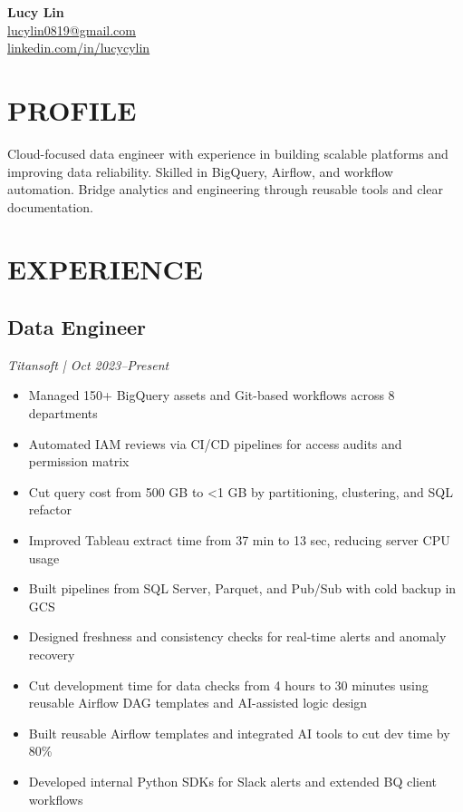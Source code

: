\documentclass[a4paper,10pt]{article}
\begin{document}
\begin{center}
    {\Huge \textbf{\seriffont Lucy Lin}} \\
    \vspace{0.5em}
     \href{mailto:lucylin0819@gmail.com}{lucylin0819@gmail.com} \\
     \href{https://www.linkedin.com/in/lucycylin/}{linkedin.com/in/lucycylin}
\end{center}

\vspace{0.8em}

\section*{PROFILE}
Cloud-focused data engineer with experience in building scalable platforms and improving data reliability. Skilled in BigQuery, Airflow, and workflow automation. Bridge analytics and engineering through reusable tools and clear documentation.

\section*{EXPERIENCE}

\subsection*{Data Engineer}
\textit{\color{gray}Titansoft | Oct 2023–Present}
\begin{itemize}
    \item Managed 150+ BigQuery assets and Git-based workflows across 8 departments
    \item Automated IAM reviews via CI/CD pipelines for access audits and permission matrix
    \item Cut query cost from 500 GB to <1 GB by partitioning, clustering, and SQL refactor
    \item Improved Tableau extract time from 37 min to 13 sec, reducing server CPU usage
    \item Built pipelines from SQL Server, Parquet, and Pub/Sub with cold backup in GCS
    \item Designed freshness and consistency checks for real-time alerts and anomaly recovery
    \item Cut development time for data checks from 4 hours to 30 minutes using reusable Airflow DAG templates and AI-assisted logic design
    \item Built reusable Airflow templates and integrated AI tools to cut dev time by 80\%
    \item Developed internal Python SDKs for Slack alerts and extended BQ client workflows
  \end{itemize}
\end{document}
